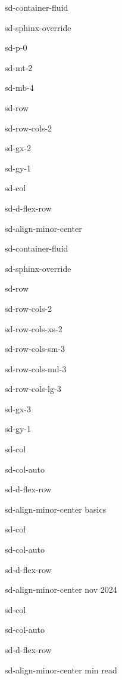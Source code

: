 \documentclass[letterpaper,10pt,italian]{jupyterBook}
\begin{document}
\begin{sphinxuseclass}{sd-container-fluid}
\begin{sphinxuseclass}{sd-sphinx-override}
\begin{sphinxuseclass}{sd-p-0}
\begin{sphinxuseclass}{sd-mt-2}
\begin{sphinxuseclass}{sd-mb-4}
\begin{sphinxuseclass}{sd-row}
\begin{sphinxuseclass}{sd-row-cols-2}
\begin{sphinxuseclass}{sd-gx-2}
\begin{sphinxuseclass}{sd-gy-1}
\begin{sphinxuseclass}{sd-col}
\begin{sphinxuseclass}{sd-d-flex-row}
\begin{sphinxuseclass}{sd-align-minor-center}
\begin{sphinxuseclass}{sd-container-fluid}
\begin{sphinxuseclass}{sd-sphinx-override}
\begin{sphinxuseclass}{sd-row}
\begin{sphinxuseclass}{sd-row-cols-2}
\begin{sphinxuseclass}{sd-row-cols-xs-2}
\begin{sphinxuseclass}{sd-row-cols-sm-3}
\begin{sphinxuseclass}{sd-row-cols-md-3}
\begin{sphinxuseclass}{sd-row-cols-lg-3}
\begin{sphinxuseclass}{sd-gx-3}
\begin{sphinxuseclass}{sd-gy-1}
\begin{sphinxuseclass}{sd-col}
\begin{sphinxuseclass}{sd-col-auto}
\begin{sphinxuseclass}{sd-d-flex-row}
\begin{sphinxuseclass}{sd-align-minor-center}
\sphinxAtStartPar
basics

\end{sphinxuseclass}
\end{sphinxuseclass}
\end{sphinxuseclass}
\end{sphinxuseclass}
\begin{sphinxuseclass}{sd-col}
\begin{sphinxuseclass}{sd-col-auto}
\begin{sphinxuseclass}{sd-d-flex-row}
\begin{sphinxuseclass}{sd-align-minor-center}
 nov 2024

\end{sphinxuseclass}
\end{sphinxuseclass}
\end{sphinxuseclass}
\end{sphinxuseclass}
\begin{sphinxuseclass}{sd-col}
\begin{sphinxuseclass}{sd-col-auto}
\begin{sphinxuseclass}{sd-d-flex-row}
\begin{sphinxuseclass}{sd-align-minor-center}
 min read


\end{sphinxuseclass}
\end{sphinxuseclass}
\end{sphinxuseclass}
\end{sphinxuseclass}
\end{sphinxuseclass}
\end{sphinxuseclass}
\end{sphinxuseclass}
\end{sphinxuseclass}
\end{sphinxuseclass}
\end{sphinxuseclass}
\end{sphinxuseclass}
\end{sphinxuseclass}
\end{sphinxuseclass}
\end{sphinxuseclass}
\end{sphinxuseclass}
\end{sphinxuseclass}
\end{sphinxuseclass}
\end{sphinxuseclass}
\end{sphinxuseclass}
\end{sphinxuseclass}
\end{sphinxuseclass}
\end{sphinxuseclass}
\end{sphinxuseclass}
\end{sphinxuseclass}
\end{sphinxuseclass}
\end{sphinxuseclass}
\end{document}
